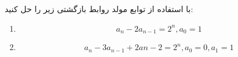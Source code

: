     \p 
با استفاده از توابع مولد روابط بازگشتی زیر را حل کنید:
\begin{enumerate}
\item
$$a_n - 2a_{n-1} = 2^n, a_0 = 1$$
\item
$$a_n - 3a_{n-1} + 2a{n-2} = 2^n, a_0 = 0, a_1 = 1$$
\end{enumerate}